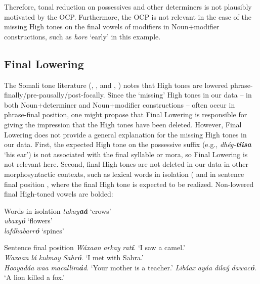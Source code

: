 \documentclass[output=paper]{langscibook}
\begin{document}
Therefore, tonal reduction on possessives and other determiners is not plausibly motivated by the OCP. Furthermore, the OCP is not relevant in the case of the missing High tones on the final vowels of modifiers in Noun+modifier constructions, such as \textit{hore} ‘early’ in this example.

\subsection{Final Lowering}


The Somali tone literature (\citealt{Andrzejewski1981,Armstrong1934,Hyman1981}, \citealt{LeGac2003}, and \citealt{Saeed1993}, \citeyear{Saeed1999}) notes that High tones are lowered phrase-finally/pre-pausally/post-focally. Since the ‘missing’ High tones in our data – in both Noun+determiner and Noun+modifier constructions – often occur in phrase-final position, one might propose that Final Lowering is responsible for giving the impression that the High tones have been deleted. However, Final Lowering does not provide a general explanation for the missing High tones in our data. First, the expected High tone on the possessive suffix (e.g., \textit{dhég-}\textbf{\textit{tíisa}} ‘his ear’) is not associated with the final syllable or mora, so Final Lowering is not relevant here. Second, final High tones are not deleted in our data in other morphosyntactic contexts, such as lexical words in isolation ( and in sentence final position , where the final High tone is expected to be realized. Non-lowered final High-toned vowels are bolded:


\ea  Words in isolation  \label{ex:downing:10}
\ea  \textit{tukay}\textbf{\textit{aá}}  ‘crows’ \\
\ex   \textit{ubaxy}\textbf{\textit{ó}}  ‘flowers’ \\
\ex   \textit{lafdhabarr}\textbf{\textit{ó}}  ‘spines’\\
\z
\z

\ea  Sentence final position \label{ex:downing:11}
\ea  \textit{Wáxaan} \textit{arkay} \textit{rat}\textbf{\textit{í}}.  ‘I saw a camel.’ \\
\ex   \textit{Waxaan} \textit{lá} \textit{kulmay} \textit{Sahr}\textbf{\textit{ó}}.  ‘I met with Sahra.’\\
\ex \textit{Hooyadáa} \textit{waa} \textit{macallim}\textbf{\textit{á}}\textit{d}.  ‘Your mother is a teacher.’
\ex \textit{Libáax} \textit{ayáa} \textit{dilaý} \textit{dawac}\textbf{\textit{ó}}.  ‘A lion killed a fox.’
\z
\z
\end{document}
